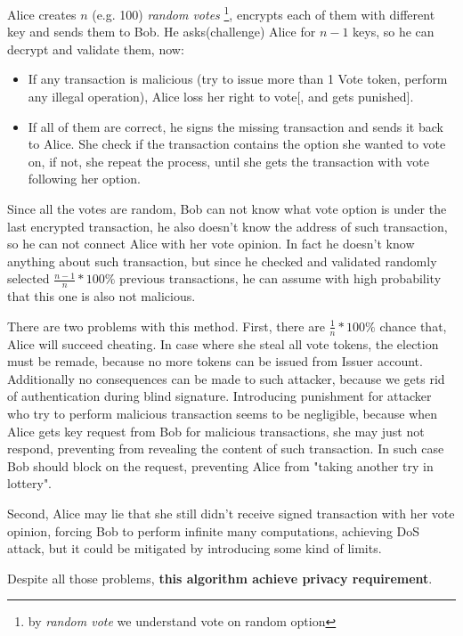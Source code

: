 \documentclass[runningheads]{llncs}
\begin{document}
Alice creates \(n\) (e.g. 100) \textit{random votes} \footnote{by \textit{random vote} we understand vote on random option}, encrypts each of them with different key and sends them to Bob. He asks(challenge) Alice for \(n-1\) keys, so he can decrypt and validate them, now: 
\begin{itemize}
 \item If any transaction is malicious (try to issue more than 1 Vote token, perform any illegal operation), Alice loss her right to vote[, and gets punished].

 \item If all of them are correct, he signs the missing transaction and sends it back to Alice. She check if the transaction contains the option she wanted to vote on, if not, she repeat the process, until she gets the transaction with vote following her option.
\end{itemize}
Since all the votes are random, Bob can not know what vote option is under the last encrypted transaction, he also doesn't know the address of such transaction, so he can not connect Alice with her vote opinion. In fact he doesn't know anything about such transaction, but since he checked and validated randomly selected \(\frac{n-1}{n}*100\%\) previous transactions, he can assume with high probability that this one is also not malicious.

There are two problems with this method.
First, there are \(\frac{1}{n}*100\%\) chance that, Alice will succeed cheating. In case where she steal all vote tokens, the election must be remade, because no more tokens can be issued from Issuer account. Additionally no consequences can be made to such attacker, because we gets rid of authentication during blind signature. Introducing punishment for attacker who try to perform malicious transaction seems to be negligible, because when Alice gets key request from Bob for malicious transactions, she may just not respond, preventing from revealing the content of such transaction. In such case Bob should block on the request, preventing Alice from "taking another try in lottery".

Second, Alice may lie that she still didn't receive signed transaction with her vote opinion, forcing Bob to perform infinite many computations, achieving DoS attack, but it could be mitigated by introducing some kind of limits.

Despite all those problems, \textbf{this algorithm achieve privacy requirement}.

\end{document}
